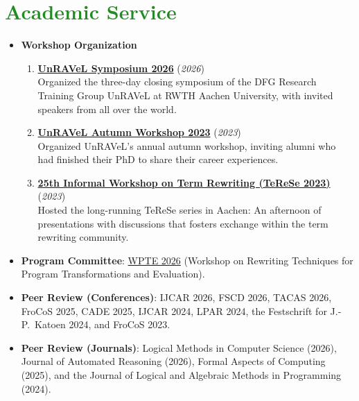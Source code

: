 \documentclass[letterpaper,11pt]{article}
\newcommand{\resumeSubHeadingListStart}{\begin{itemize}[leftmargin=*]}
\newcommand{\resumeSubHeadingListEnd}{\end{itemize}}
\begin{document}
\section{\textcolor{ForestGreen}{Academic Service}}
  \resumeSubHeadingListStart
    \item \textbf{Workshop Organization}
    \begin{enumerate}
      \item \textbf{\href{https://www.unravel.rwth-aachen.de/cms/unravel/das-graduiertenkolleg/aktuelle-veranstaltungen/~bjgvkb/unravel-final-workshop-2026/?lidx=1}{UnRAVeL Symposium 2026}} \hfill (\textit{2026}) \\
        Organized the three-day closing symposium of the DFG Research Training Group UnRAVeL at RWTH Aachen University, with invited speakers from all over the world.
      \item \textbf{\href{https://www.unravel.rwth-aachen.de/go/id/bdnjuy}{UnRAVeL Autumn Workshop 2023}} \hfill (\textit{2023}) \\
        Organized UnRAVeL's annual autumn workshop, inviting alumni who had finished their PhD to share their career experiences.
      \item \textbf{\href{https://verify.rwth-aachen.de/jckassing/terese23/}{25th Informal Workshop on Term Rewriting (TeReSe 2023)}} \hfill (\textit{2023}) \\
        Hosted the long-running TeReSe series in Aachen: An afternoon of presentations with discussions that fosters exchange within the term rewriting community.
    \end{enumerate}
    \item \textbf{Program Committee}: \href{https://wpte2026.github.io/}{WPTE 2026} (Workshop on Rewriting Techniques for Program Transformations and Evaluation).
    \item \textbf{Peer Review (Conferences)}: IJCAR 2026, FSCD 2026, TACAS 2026, FroCoS 2025, CADE 2025, IJCAR 2024, LPAR 2024, the Festschrift for J.-P.\ Katoen 2024, and FroCoS 2023.
    \item \textbf{Peer Review (Journals)}: Logical Methods in Computer Science (2026), Journal of Automated Reasoning (2026), Formal Aspects of Computing (2025), and the Journal of Logical and Algebraic Methods in Programming (2024).
  \resumeSubHeadingListEnd

\end{document}
